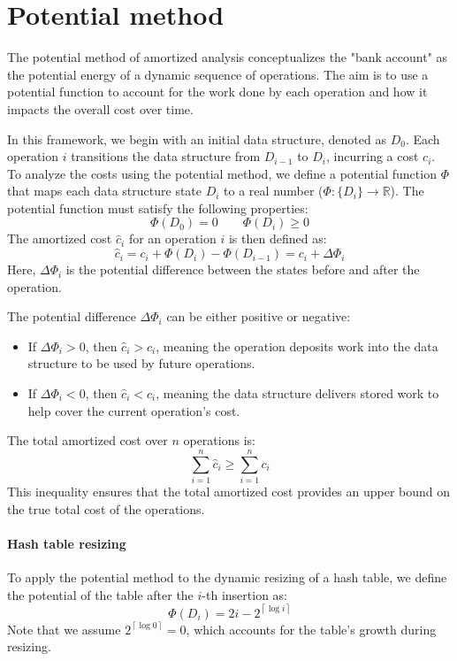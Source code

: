 \section{Potential method}

The potential method of amortized analysis conceptualizes the "bank account" as the potential energy of a dynamic sequence of operations.
The aim is to use a potential function to account for the work done by each operation and how it impacts the overall cost over time.

In this framework, we begin with an initial data structure, denoted as $D_0$. Each operation $i$ transitions the data structure from $D_{i-1}$ to $D_i$, incurring a cost $c_i$. 
To analyze the costs using the potential method, we define a potential function $\Phi$ that maps each data structure state $D_i$ to a real number ($\Phi: \{D_i\} \rightarrow \mathbb{R}$).
The potential function must satisfy the following properties:
\[\Phi(D_0) = 0 \qquad \Phi(D_i ) \geq 0\]
The amortized cost $\hat{c}_i$ for an operation $i$ is then defined as:
\[\hat{c}_i=c_i+\Phi(D_i)-\Phi(D_{i-1})=c_i+\Delta\Phi_i\]
Here, $\Delta\Phi_i$ is the potential difference between the states before and after the operation.

The potential difference $\Delta\Phi_i$ can be either positive or negative:
\begin{itemize}
    \item If $\Delta\Phi_i>0$, then $\hat{c}_i>c_i$, meaning the operation deposits work into the data structure to be used by future operations.
    \item If $\Delta\Phi_i<0$, then $\hat{c}_i<c_i$, meaning the data structure delivers stored work to help cover the current operation's cost.
\end{itemize}
The total amortized cost over $n$ operations is:
\[\sum_{i=1}^n\hat{c}_i\geq\sum_{i=1}^nc_i\]
This inequality ensures that the total amortized cost provides an upper bound on the true total cost of the operations.

\paragraph*{Hash table resizing}
To apply the potential method to the dynamic resizing of a hash table, we define the potential of the table after the $i$-th insertion as:
\[\Phi(D_i) =2i - 2^{\left\lceil \log i\right\rceil }\] 
Note that we assume $2^{\left\lceil \log 0\right\rceil }=0$, which accounts for the table's growth during resizing.

